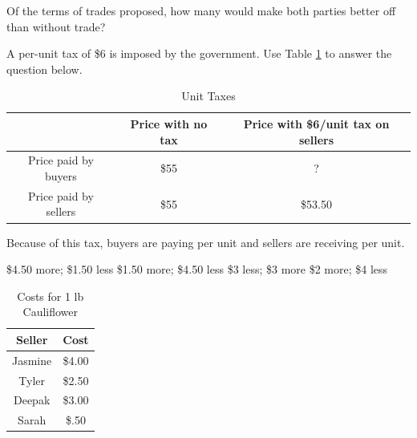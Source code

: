 \documentclass[addpoints,11pt]{exam}
\theoremstyle{definition}
\newcommand{\blank}[0]{\underline{\hspace{3cm}}}
\begin{document}
\begin{questions}
\begin{choices}
\end{choices}


\question \label{q14} Of the terms of trades proposed, how many would make both parties better off than without trade?

\begin{choices}
\end{choices}


\newpage

\question A per-unit tax of \$6 is imposed by the government. Use Table \ref{MC27} to answer the question below.

\begin{table}[h!]
	\caption{Unit Taxes}
	\centering
	\begin{tabular}{ c|c|c} 
		
		& Price with no tax & Price with \$6/unit tax on sellers \\
		\hline
		Price paid by buyers & \$55 & ? \\
		Price paid by sellers & \$55 & \$53.50  \\
	\end{tabular}
	\label{MC27}
\end{table}

Because of this tax, buyers are paying \blank per unit and sellers are receiving \blank per unit.

\begin{choices}
	\CorrectChoice \$4.50 more; \$1.50 less
	\choice \$1.50 more; \$4.50 less
	\choice \$3 less; \$3 more
	\choice \$2 more; \$4 less
\end{choices}



\begin{table}[H]
	\caption{Costs for 1 lb Cauliflower}
	\label{wtp}
	\centering
	\begin{tabular}{  c|c    }    
		
		Seller   & Cost \\
		\hline
		Jasmine & \$4.00 \\
		Tyler & \$2.50 \\
		Deepak & \$3.00 \\
		Sarah & \$.50 \\
	\end{tabular}
	

\end{table}
\end{questions}
\end{document}
